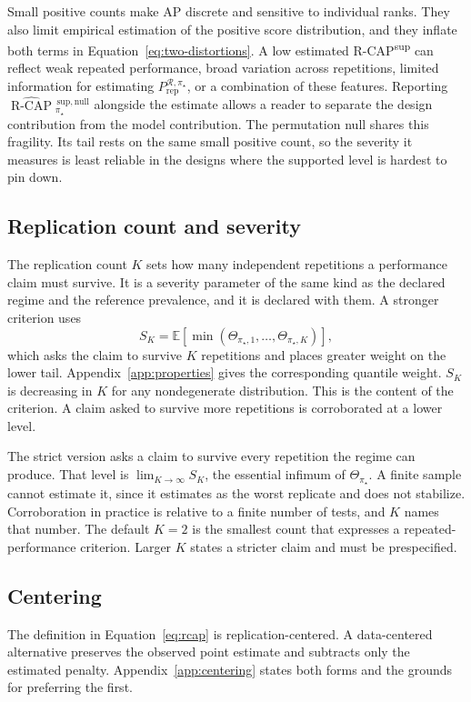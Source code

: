 \documentclass[11pt]{article}
\newcommand{\Regime}{\mathcal{R}}
\newcommand{\E}{\mathbb{E}}
\newcommand{\RCAPnullHat}{\widehat{\operatorname{R\text{-}CAP}}{}^{\,\mathrm{sup,null}}_{\pi_\star}}
\newcommand{\PRep}{P_{\mathrm{rep}}^{\Regime,\pi_\star}}
\theoremstyle{remark}
\begin{document}
Small positive counts make AP discrete and sensitive to individual ranks. They also limit empirical estimation of the positive score distribution, and they inflate both terms in Equation~\eqref{eq:two-distortions}. A low estimated R-CAP\textsuperscript{sup} can reflect weak repeated performance, broad variation across repetitions, limited information for estimating $\PRep$, or a combination of these features. Reporting $\RCAPnullHat$ alongside the estimate allows a reader to separate the design contribution from the model contribution. The permutation null shares this fragility. Its tail rests on the same small positive count, so the severity it measures is least reliable in the designs where the supported level is hardest to pin down.

\subsection{Replication count and severity}

The replication count $K$ sets how many independent repetitions a performance claim must survive. It is a severity parameter of the same kind as the declared regime and the reference prevalence, and it is declared with them. A stronger criterion uses
\[
S_K
=
\E\left[
\min(\Theta_{\pi_\star,1},\ldots,\Theta_{\pi_\star,K})
\right],
\]
which asks the claim to survive $K$ repetitions and places greater weight on the lower tail. Appendix~\ref{app:properties} gives the corresponding quantile weight. $S_K$ is decreasing in $K$ for any nondegenerate distribution. This is the content of the criterion. A claim asked to survive more repetitions is corroborated at a lower level.

The strict version asks a claim to survive every repetition the regime can produce. That level is $\lim_{K\to\infty}S_K$, the essential infimum of $\Theta_{\pi_\star}$. A finite sample cannot estimate it, since it estimates as the worst replicate and does not stabilize. Corroboration in practice is relative to a finite number of tests, and $K$ names that number. The default $K=2$ is the smallest count that expresses a repeated-performance criterion. Larger $K$ states a stricter claim and must be prespecified.

\subsection{Centering}

The definition in Equation~\eqref{eq:rcap} is replication-centered. A data-centered alternative preserves the observed point estimate and subtracts only the estimated penalty. Appendix~\ref{app:centering} states both forms and the grounds for preferring the first.
\end{document}
